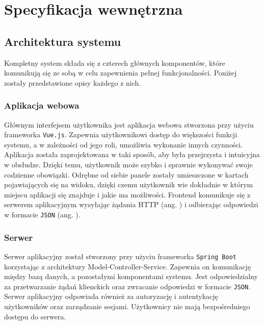 \chapter{Specyfikacja wewnętrzna}
\label{ch:05}

\section{Architektura systemu}


Kompletny system składa się z czterech głównych komponentów, które komunikują się ze sobą w celu zapewnienia pełnej funkcjonalności. Poniżej zostały przedstawione opisy każdego z nich.

\subsection{Aplikacja webowa}

Głównym interfejsem użytkownika jest aplikacja webowa stworzona przy użyciu frameworka \texttt{Vue.js}. Zapewnia użytkownikowi dostęp do większości funkcji systemu, a w zależności od jego roli, umożliwia wykonanie innych czynności. Aplikacja została zaprojektowana w taki sposób, aby była przejrzysta i intuicyjna w obsłudze. Dzięki temu, użytkownik może szybko i sprawnie wykonywać swoje codzienne obowiązki. Odrębne od siebie panele zostały umieszczone w kartach pojawiających się na widoku, dzięki czemu użytkownik wie dokładnie w którym miejscu aplikacji się znajduje i jakie ma możliwości. Frontend komunikuje się z serwerem aplikacyjnym wysyłając żądania HTTP (ang. ) i odbierając odpowiedzi w formacie \texttt{JSON} (ang. ).

\subsection{Serwer}

Serwer aplikacyjny został stworzony przy użyciu frameworka \texttt{Spring Boot} korzystając z architektury Model-Controller-Service. Zapewnia on komunikację między bazą danych, a pozostałymi komponentami systemu. Jest odpowiedzialny za przetwarzanie żądań klienckich oraz zwracanie odpowiedzi w formacie \texttt{JSON}. Serwer aplikacyjny odpowiada również za autoryzację i autentykację użytkowników oraz zarządzanie sesjami. Użytkownicy nie mają bezpośredniego dostępu do serwera.

